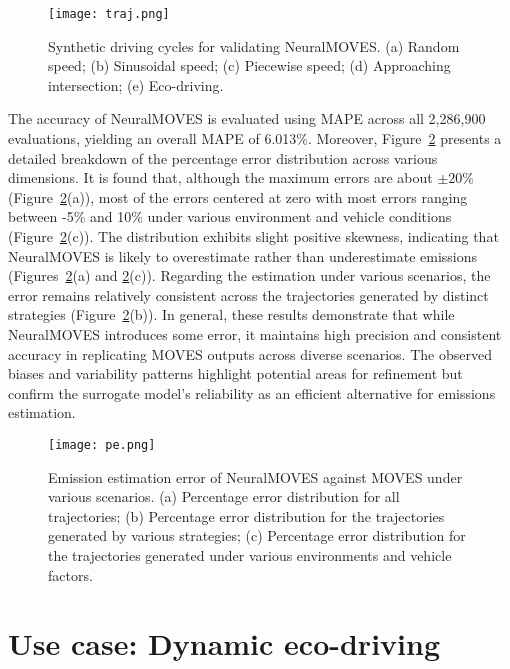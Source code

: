 \documentclass[12pt,english]{article}
\begin{document}
\begin{figure}
    \centering
    \texttt{[image: traj.png]}
    \caption{Synthetic driving cycles for validating NeuralMOVES. (a) Random speed; (b) Sinusoidal speed; (c) Piecewise speed; (d) Approaching intersection; (e) Eco-driving.}
    \label{fig:traj}
\end{figure}




The accuracy of NeuralMOVES is evaluated using MAPE across all 2,286,900 evaluations, yielding an overall MAPE of 6.013\%. 
Moreover, Figure~\ref{fig:PE} presents a detailed breakdown of the percentage error distribution across various dimensions. 
It is found that, although the maximum errors are about $\pm20\%$ (Figure~\ref{fig:PE}(a)), most of the errors centered at zero with most errors ranging between -5\% and 10\% under various environment and vehicle conditions (Figure~\ref{fig:PE}(c)).
The distribution exhibits slight positive skewness, indicating that NeuralMOVES is likely to overestimate rather than underestimate emissions (Figures~\ref{fig:PE}(a) and \ref{fig:PE}(c)).
Regarding the estimation under various scenarios, the error remains relatively consistent across the trajectories generated by distinct strategies (Figure~\ref{fig:PE}(b)).
In general, these results demonstrate that while NeuralMOVES introduces some error, it maintains high precision and consistent accuracy in replicating MOVES outputs across diverse scenarios. The observed biases and variability patterns highlight potential areas for refinement but confirm the surrogate model’s reliability as an efficient alternative for emissions estimation.



\begin{figure}
    \centering
    \texttt{[image: pe.png]}
    \caption{Emission estimation error of NeuralMOVES against MOVES under various scenarios. 
    (a) Percentage error distribution for all trajectories;
    (b) Percentage error distribution for the trajectories generated by various strategies;
    (c) Percentage error distribution for the trajectories generated under various environments and vehicle factors.}
    \label{fig:PE}
\end{figure}



\section{Use case: Dynamic eco-driving}\label{sec:UseCase}
\end{document}
